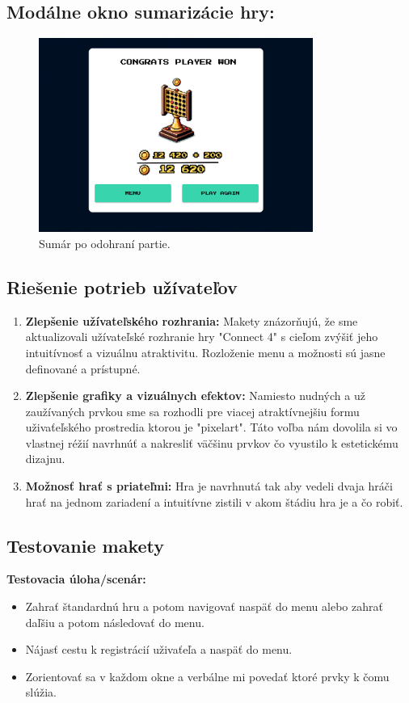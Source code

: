 \documentclass[a4paper, 11pt, onecolumn]{article}
\begin{document}
\subsection*{Modálne okno sumarizácie hry:}
\begin{figure}[H]
  \centering
  \includegraphics[width=0.8\textwidth]{Vyhra.png}
  \caption{ Sumár po odohraní partie.}
  \label{fig:sumár_label}
\end{figure}
\subsection*{Riešenie potrieb užívateľov}
\begin{enumerate}
  \item \textbf{Zlepšenie užívateľského rozhrania:} Makety znázorňujú, že sme aktualizovali užívateľské rozhranie hry "Connect 4" s cieľom zvýšiť jeho intuitívnosť a vizuálnu atraktivitu. Rozloženie menu a možnosti sú jasne definované a prístupné.
  \item \textbf{Zlepšenie grafiky a vizuálnych efektov:} Namiesto nudných a už zaužívaných prvkou sme sa rozhodli pre viacej atraktívnejšiu formu uživaťeľského prostredia ktorou je "pixelart". Táto voľba nám dovolila si vo vlastnej réžií navrhnúť a nakresliť väčšinu prvkov čo vyustilo k estetickému dizajnu.
  \item \textbf{Možnosť hrať s priateľmi:} Hra je navrhnutá tak aby vedeli dvaja hráči hrať na jednom zariadení a intuitívne zistili v akom štádiu hra je a čo robiť.
\end{enumerate}

\subsection*{Testovanie makety}
\textbf{Testovacia úloha/scenár:} 
\begin{itemize}
  \item Zahrať štandardnú hru a potom navigovať naspäť do menu alebo zahrať daľšiu a potom následovať do menu.
  \item Nájasť cestu k registrácií uživaťeľa a naspäť do menu.
  \item Zorientovať sa v  každom okne a verbálne mi povedať ktoré prvky k čomu slúžia.
\end{itemize}
\end{document}
